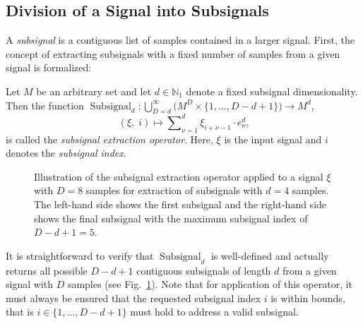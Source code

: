 \documentclass[journal]{IEEEtran}
\newcommand{\figurescalefactor}{0.995}
\newcommand{\N}{\mathbb{N}}
\newcommand{\discint}[2]{\{#1,\dotsc,#2\}}
\newcommand{\inint}[2]{\in\discint{#1}{#2}}
\DeclareMathOperator{\Subsignal}{Subsignal}
\begin{document}
\subsection{Division of a Signal into Subsignals}
A \emph{subsignal} is a contiguous list of samples contained in a larger signal.
First, the concept of extracting subsignals with a fixed number of samples from a given signal is formalized:
\begin{definition}
\label{def:subsignal}
Let $M$ be an arbitrary set and let $d\in\N_1$ denote a fixed subsignal dimensionality.
Then the function $\Subsignal_d\colon\bigcup_{D = d}^\infty\big(M^D\times\discint{1}{D - d + 1}\big)\to M^d$,
\begin{displaymath}
  (\xi,\; i)\mapsto\sum\nolimits_{\nu = 1}^d \xi_{i + \nu - 1}\cdot e_\nu^d\text{,}
\end{displaymath}
is called the \emph{subsignal extraction operator}.
Here, $\xi$ is the input signal and $i$ denotes the \emph{subsignal index}.
\end{definition}

\begin{figure}[t]
  \centering
  \scalebox{\figurescalefactor}{\texttt{[image: paper-pics.pdf]}}
  \caption{Illustration of the subsignal extraction operator applied to a signal $\xi$ with $D = 8$ samples for extraction of subsignals with $d = 4$ samples.
    The left-hand side shows the first subsignal and the right-hand side shows the final subsignal with the maximum subsignal index of $D - d + 1 = 5$.}
  \label{fig:subsignal}
\end{figure}

It is straightforward to verify that $\Subsignal_d$ is well-defined and actually returns all possible $D - d + 1$ contiguous subsignals of length $d$ from a given signal with $D$ samples (see Fig.~\ref{fig:subsignal}).
Note that for application of this operator, it must always be ensured that the requested subsignal index $i$ is within bounds, that is $i\inint{1}{D - d + 1}$ must hold to address a valid subsignal.
\end{document}
